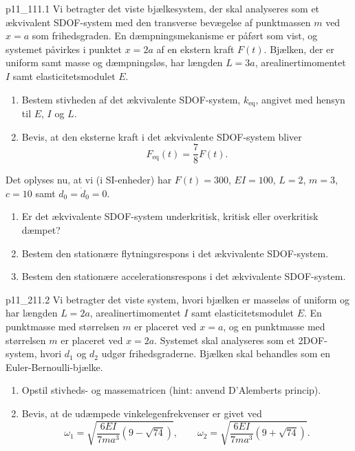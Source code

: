 
\begin{problemwithimage}{p11_1}{11.1}
  Vi betragter det viste bjælkesystem, der skal analyseres som et ækvivalent SDOF-system med den transverse bevægelse af punktmassen $m$ ved $x = a$ som frihedsgraden.
  En dæmpningsmekanisme er påført som vist, og systemet påvirkes i punktet $x = 2a$ af en ekstern kraft $F(t)$.
  Bjælken, der er uniform samt masse og dæmpningsløs, har længden $L = 3a$, arealinertimomentet $I$ samt elasticitetsmodulet $E$.

  \begin{enumerate}[label=\alph*)]
    \item Bestem stivheden af det ækvivalente SDOF-system, $k_{\mathrm{eq}}$, angivet med hensyn til $E$, $I$ og $L$.
    \item Bevis, at  den eksterne kraft i det ækvivalente SDOF-system bliver
      \begin{equation*}
        F_{\mathrm{eq}}(t) = \frac{7}{8} F(t)
      .\end{equation*}
  \end{enumerate}
  Det oplyses nu, at vi (i SI-enheder) har $F(t) = 300$, $EI = 100$, $L = 2$, $m = 3$, $c = 10$ samt $d_0 = \dot{d}_0 = 0$.
  \begin{enumerate}[resume]
    \item Er det ækvivalente SDOF-system underkritisk, kritisk eller overkritisk dæmpet?
    \item Bestem den stationære flytningsrespons i det ækvivalente SDOF-system.
    \item Bestem den stationære accelerationsrespons i det ækvivalente SDOF-system.
  \end{enumerate}
\end{problemwithimage}

\begin{problemwithimage}{p11_2}{11.2}
  Vi betragter det viste system, hvori bjælken er masseløs of uniform og har længden $L = 2a$, arealinertimomentet $I$ samt elasticitetsmodulet $E$.
  En punktmasse med størrelsen $m$ er placeret ved $x = a$, og en punktmasse med størrelsen $m$ er placeret ved $x = 2a$.
  Systemet skal analyseres som et 2DOF-system, hvori $d_1$ og $d_2$ udgør frihedsgraderne.
  Bjælken skal behandles som en Euler-Bernoulli-bjælke.

  \begin{enumerate}[label=\alph*)]
    \item Opstil stivheds- og massematricen (hint: anvend D'Alemberts princip).
    \item Bevis, at de udæmpede vinkelegenfrekvenser er givet ved
      \begin{equation*}
        \omega_1 = \sqrt{\frac{6EI}{7ma^3} \left( 9 - \sqrt{74} \right)}, \qquad \omega_2 = \sqrt{\frac{6EI}{7ma^3} \left( 9 + \sqrt{74} \right)}
      .\end{equation*}
  \end{enumerate}
\end{problemwithimage}

